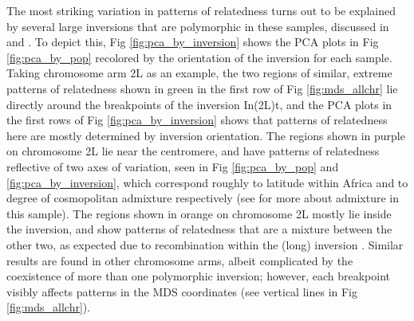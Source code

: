 \documentclass[11pt, oneside]{article}   	%
\newcommand\citet{\cite}
\newcommand\citep{\cite}
\newcommand{\Figure}{Fig }
\newcommand{\Figures}{Fig }
\newcommand{\Figure}{{Figure }}
\newcommand{\Figures}{{Figures }}
\newcommand{\plr}[1]{{\em \color{blue} #1}}
\begin{document}
The most striking variation in patterns of relatedness turns out to be explained by
several large inversions that are polymorphic in these samples, 
discussed in \citet{corbett2012population} and \citet{langley2012genomic}.
To depict this, \Figure \ref{fig:pca_by_inversion} shows
the PCA plots in \Figure \ref{fig:pca_by_pop} recolored by the orientation of the inversion for each sample.
Taking chromosome arm 2L as an example,
the two regions of similar, extreme patterns of relatedness
shown in green in the first row of \Figure \ref{fig:mds_allchr}
lie directly around the breakpoints of the inversion In(2L)t,
and the PCA plots in the first rows of \Figure \ref{fig:pca_by_inversion}
shows that patterns of relatedness here are mostly determined by inversion orientation.
The regions shown in purple on chromosome 2L lie near the centromere,
and have patterns of relatedness reflective of two axes of variation,
seen in \Figures \ref{fig:pca_by_pop} and \ref{fig:pca_by_inversion},
which correspond roughly to latitude within Africa and to degree of cosmopolitan admixture respectively
(see \citet{lack2015drosophila} for more about admixture in this sample).
The regions shown in orange on chromosome 2L mostly lie inside the inversion,
and show patterns of relatedness that are a mixture between the other two,
as expected due to recombination within the (long) inversion \citep{guerrero2011coalescent}.
Similar results are found in other chromosome arms,
albeit complicated by the coexistence of more than one polymorphic inversion;
however, each breakpoint visibly affects patterns in the MDS coordinates
(see vertical lines in \Figure \ref{fig:mds_allchr}).
\end{document}

